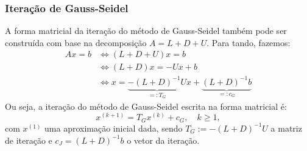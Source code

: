 \subsubsection{Iteração de Gauss-Seidel}

A forma matricial da iteração do método de Gauss-Seidel também pode ser construída com base na decomposição $A = L + D + U$. Para tando, fazemos:
\begin{align*}
  Ax = b &\Leftrightarrow (L + D + U)x = b\\
  &\Leftrightarrow (L + D)x = -Ux + b\\
  &\Leftrightarrow x = \underbrace{-(L + D)^{-1}U}_{=: T_G}x + \underbrace{(L+D)^{-1}b}_{=: c_G}
\end{align*}
Ou seja, a iteração do método de Gauss-Seidel escrita na forma matricial é:
\begin{equation*}
  x^{(k+1)} = T_Gx^{(k)} + c_G,\quad k\geq 1,
\end{equation*}
com $x^{(1)}$ uma aproximação inicial dada, sendo $T_G := -(L+D)^{-1}U$ a matriz de iteração e $c_J = (L+D)^{-1}b$ o vetor da iteração.


